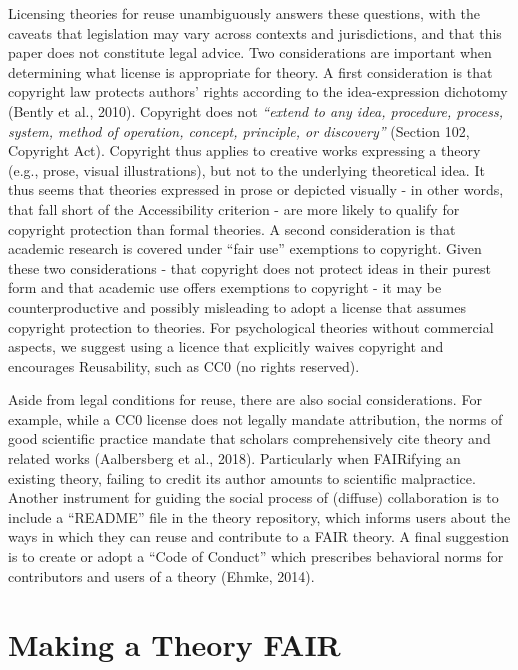 \documentclass[
  man, noextraspace,floatsintext]{apa7}
\begin{document}
Licensing theories for reuse unambiguously answers these questions,
with the caveats that legislation may vary across contexts and jurisdictions, and that this paper does not constitute legal advice.
Two considerations are important when determining what license is appropriate for theory.
A first consideration is that copyright law protects authors' rights according to the idea-expression dichotomy (Bently et al., 2010).
Copyright does not
\emph{``extend to any idea, procedure, process, system, method of operation, concept, principle, or discovery''} (Section 102, Copyright Act).
Copyright thus applies to creative works expressing a theory (e.g., prose, visual illustrations),
but not to the underlying theoretical idea.
It thus seems that theories expressed in prose or depicted visually - in other words, that fall short of the Accessibility criterion - are more likely to qualify for copyright protection than formal theories.
A second consideration is that academic research is covered under ``fair use'' exemptions to copyright.
Given these two considerations - that copyright does not protect ideas in their purest form and that academic use offers exemptions to copyright - it may be counterproductive and possibly misleading to adopt a license that assumes copyright protection to theories.
For psychological theories without commercial aspects, we suggest using a licence that explicitly waives copyright and encourages Reusability,
such as CC0 (no rights reserved).

Aside from legal conditions for reuse, there are also social considerations.
For example, while a CC0 license does not legally mandate attribution,
the norms of good scientific practice mandate that scholars comprehensively cite theory and related works (Aalbersberg et al., 2018).
Particularly when FAIRifying an existing theory, failing to credit its author amounts to scientific malpractice.
Another instrument for guiding the social process of (diffuse) collaboration is to include a ``README'' file in the theory repository, which informs users about the ways in which they can reuse and contribute to a FAIR theory.
A final suggestion is to create or adopt a ``Code of Conduct'' which prescribes behavioral norms for contributors and users of a theory (Ehmke, 2014).

\section{Making a Theory FAIR}\label{making-a-theory-fair}
\end{document}
